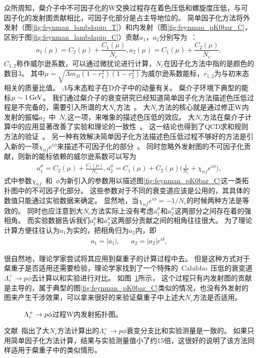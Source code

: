 众所周知，粲介子中不可因子化的W交换过程存在着色压低和螺旋度压低，与可因子化的发射图贡献相比，可因子化部分是占主导地位的。
简单因子化方法将外发射（图\ref{fig:feynman_lambdapip_T}）和内发射（图\ref{fig:feynman_pK0bar_C}，区别于图\ref{fig:feynman_lambdapip_C}）贡献$a_{1}$，$a_{2}$分别写为~\cite{Fusheng:2011tw,Li:2012cfa}：
\begin{equation}
a_1(\mu)=C_2(\mu)+\frac{C_1(\mu)}{N_c},
a_2(\mu)=C_1(\mu)+\frac{C_2(\mu)}{N_c},
\end{equation}
$C_{1,2}$称作威尔逊系数，可以通过微扰论进行计算，$N_{c}$在因子化方法中指的是颜色的数目3。
其中$\mu=\sqrt{\Lambda m_D (1-r_1^2)(1-r_2^2)}$为威尔逊系数能标，$r_{1,2}$为与初末态相关的质量比值。
$\Lambda$与末态粒子在D介子中的动量有关。
粲介子环境下典型的能标$\mu\sim 1\mathrm{\,Ge\kern -0.1em V}$。
我们通过粲介子的衰变研究已经知道简单因子化方法描述色压低过程是不完备的，需要引入所谓的大$N_{c}$方法~\cite{Buras:1985xv}。
大$N_{c}$方法的核心就是通过修正W内发射的振幅$a_{2}$~中~$N_{c}$这一项，来唯象的描述色压低的效应。
大$N_{c}$方法在粲介子计算中的应用显著改善了实验和理论的一致性~\cite{Fukugita:1977df,Tadic:1982vn,Bauer:1984zv}。
这一结论也得到了QCD求和规则方法的验证~\cite{Blok:1986um,Blok:1986hm,Blok:1986sn}。
另一种有效解决简单因子化方法描述色压低过程不够好的方法是引入新的一项$\chi_{nf} e^{i\phi}$来描述不可因子化的部分~\cite{Fusheng:2011tw,Li:2012cfa}。
同时忽略外发射图的不可因子化贡献，则新的能标依赖的威尔逊系数可以写为
\begin{eqnarray}
\label{effa}
a_1^{\mu}=C_2(\mu)+\frac{C_1(\mu)}{N_c},
a_2^{\mu}=C_1(\mu)+C_2(\mu)\bigg(\frac{1}{N_c}+\chi_{nf} e^{i\phi}\bigg),
\end{eqnarray}
式中参数$\chi_{nf}$~和~$\phi$为新引入的参数用以描述图\ref{fig:feynman_pK0bar_C}这一类拓扑图中的不可因子化部分。
这些参数对于不同的衰变道应该是公用的，其具体的数值只能通过实验数据来确定。
显然地，当$\chi_{nf} e^{i\phi}=-1/N_c$的时候两种方法是等效的。
同时也应注意到大$N_{c}$方法实际上没有考虑$a_1^{\mu}$和$a_2^{\mu}$这两部分之间存在着的强相角。
而实验数据告诉我们$a_1^{\mu}$和$a_2^{\mu}$这两部分贡献之间的相角往往很大。
为了理论计算方便往往认为$a_1$为实的，把相角归为$a_2$内，即
\begin{eqnarray}
a_1=|a_1|,&& a_2=|a_2|e^{i\delta},
\end{eqnarray}


很自然地，理论学家尝试将其应用到粲重子的计算过程中去。
但是这种方式对于粲重子是否适用还需要检验，理论学家找到了一个特殊的~Cabibbo~压低的衰变道$\Lambda_c^+\to p\phi$去计算以和实验进行对比。
如图~\ref{fig:feynman_pphi}所示， 这个过程只有内发射图的贡献是主导的，属于典型的图\ref{fig:feynman_pK0bar_C}类似的情况，也没有外发射的图来产生干涉效果，可以拿来很好的来验证粲重子中上述大$N_{c}$方法是否适用。
\begin{figure*}[!tbp]
\centering
{}
 \caption{$\Lambda_{c}^{+}\rightarrow p\phi$过程W内发射拓扑图。}
\label{fig:feynman_pphi}
\end{figure*}
文献~\cite{Cheng:1991sn}指出了大$N_{c}$方法计算出的$\Lambda_c^+\to p\phi$衰变分支比和实验测量是一致的。
如果只用简单因子化方法计算，结果与实验测量值小了约15倍，这很好的说明了该方法同样适用于粲重子中的类似情形。

